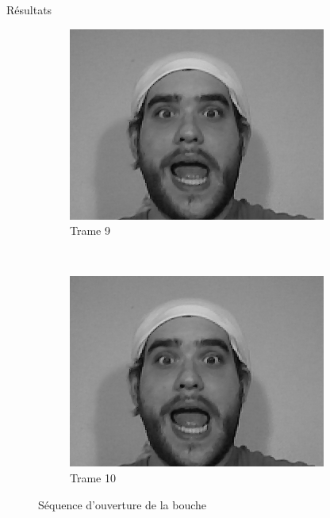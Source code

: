 \documentclass[compress,pdf,11pt,xcolor=dvipsnames]{beamer}
\begin{document}
\begin{frame}{Résultats}
\begin{figure}[ht!]
        \centering
        \begin{subfigure}[b]{0.5\textwidth}
                \centering
                \includegraphics[width=\textwidth]{img/f9}
                \caption{Trame 9}
                \label{fig:trame9}
        \end{subfigure}%
        ~ %
        \begin{subfigure}[b]{0.5\textwidth}
                \centering
               \includegraphics[width=\textwidth]{img/f10}
                \caption{Trame 10}
                \label{fig:trame10}
        \end{subfigure}
        \caption{Séquence d'ouverture de la bouche}
        \label{fig:trames910}
\end{figure}
\end{frame}{}
\end{document}
